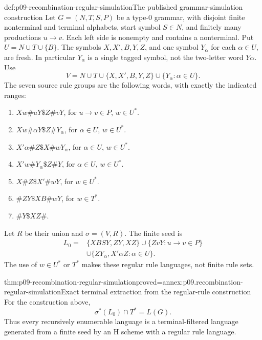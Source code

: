 \begin{hbdefinition}{def:p09-recombination-regular-simulation}{The published grammar-simulation construction}
Let \(G=(N,T,S,P)\) be a type-0 grammar, with disjoint finite nonterminal
and terminal alphabets, start symbol \(S\in N\), and finitely many
productions \(u\to v\). Each left side is nonempty and contains a
nonterminal. Put \(U=N\cup T\cup\{B\}\). The symbols
\(X,X',B,Y,Z\), and one symbol \(Y_\alpha\) for each \(\alpha\in U\),
are fresh. In particular \(Y_\alpha\) is a single tagged symbol, not
the two-letter word \(Y\alpha\). Use
\[
 V=N\cup T\cup\{X,X',B,Y,Z\}\cup\{Y_\alpha:\alpha\in U\}.
\]
The seven source rule groups are the following words, with exactly the
indicated ranges:
\begin{enumerate}
\item \(Xw\#uY\$Z\#vY\), for \(u\to v\in P\), \(w\in U^*\).
\item \(Xw\#\alpha Y\$Z\#Y_\alpha\), for \(\alpha\in U\), \(w\in U^*\).
\item \(X'\alpha\#Z\$X\#wY_\alpha\), for \(\alpha\in U\), \(w\in U^*\).
\item \(X'w\#Y_\alpha\$Z\#Y\), for \(\alpha\in U\), \(w\in U^*\).
\item \(X\#Z\$X'\#wY\), for \(w\in U^*\).
\item \(\#ZY\$XB\#wY\), for \(w\in T^*\).
\item \(\#Y\$XZ\#\).
\end{enumerate}
Let \(R\) be their union and \(\sigma=(V,R)\). The finite seed is
\[
\begin{split}
 L_0={}&\{XBSY,ZY,XZ\}\cup\{ZvY:u\to v\in P\}\\
      &\cup\{ZY_\alpha,X'\alpha Z:\alpha\in U\}.
\end{split}
\]
The use of \(w\in U^*\) or \(T^*\) makes these regular rule languages,
not finite rule sets.
\end{hbdefinition}

\begin{hbtheorem}{thm:p09-recombination-regular-simulation}{proved=annex:p09.recombination-regular-simulation}{Exact terminal extraction from the regular-rule construction}
For the construction above,
\[
 \sigma^*(L_0)\cap T^*=L(G).
\]
Thus every recursively enumerable language is a terminal-filtered language
generated from a finite seed by an H scheme with a regular rule language.
\end{hbtheorem}

